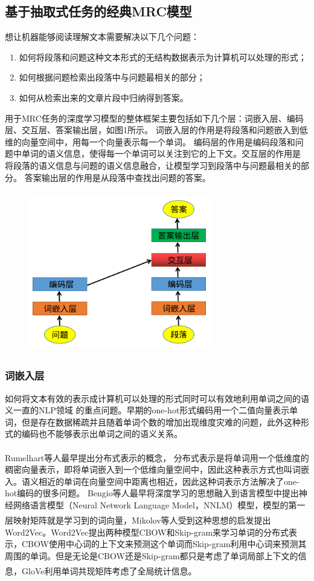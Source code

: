 \documentclass{article}
\newcommand{\upcite}[1]{\textsuperscript{\textsuperscript{\cite{#1}}}}
\begin{document}
\subsection{基于抽取式任务的经典MRC模型}
想让机器能够阅读理解文本需要解决以下几个问题：
\begin{enumerate}
	\item 如何将段落和问题这种文本形式的无结构数据表示为计算机可以处理的形式；
	\item 如何根据问题检索出段落中与问题最相关的部分；
	\item 如何从检索出来的文章片段中归纳得到答案。
\end{enumerate}
用于MRC任务的深度学习模型的整体框架主要包括如下几个层：词嵌入层、编码层、交互层、答案输出层，如图1所示。
词嵌入层的作用是将段落和问题嵌入到低维的向量空间中，用每一个向量表示每一个单词。
编码层的作用是编码段落和问题中单词的语义信息，使得每一个单词可以关注到它的上下文。交互层的作用是
将段落的语义信息与问题的语义信息融合，让模型学习到段落中与问题最相关的部分。
答案输出层的作用是从段落中查找出问题的答案。
\begin{figure}
	\centering
	\includegraphics[width=8cm,height=7cm]{generic.png}
\end{figure}

\subsubsection{词嵌入层}
如何将文本有效的表示成计算机可以处理的形式同时可以有效地利用单词之间的语义一直的NLP领域
的重点问题。早期的one-hot形式编码用一个二值向量表示单词，但是存在数据稀疏并且随着单词个数的增加出现维度灾难的问题，此外这种形式的编码也不能够表示出单词之间的语义关系。

Rumelhart等人\upcite{Rumelhart}最早提出分布式表示的概念，
分布式表示是将单词用一个低维度的稠密向量表示，即将单词嵌入到一个低维向量空间中，因此这种表示方式也叫词嵌入。语义相近的单词在向量空间中距离也相近，因此这种词表示方法解决了one-hot编码的很多问题。
Bengio等人\cite{NNLM}最早将深度学习的思想融入到语言模型中提出神经网络语言模型（Neural Network Language Model，NNLM）模型，模型的第一层映射矩阵就是学习到的词向量，Mikolov等人\upcite{word2vec}受到这种思想的启发提出Word2Vec。Word2Vec提出两种模型CBOW和Skip-gram来学习单词的分布式表示，CBOW使用中心词的上下文来预测这个单词而Skip-gram利用中心词来预测其周围的单词。但是无论是CBOW还是Skip-gram都只是考虑了单词局部上下文的信息，GloVe\upcite{GloVe}利用单词共现矩阵考虑了全局统计信息。
\end{document}
